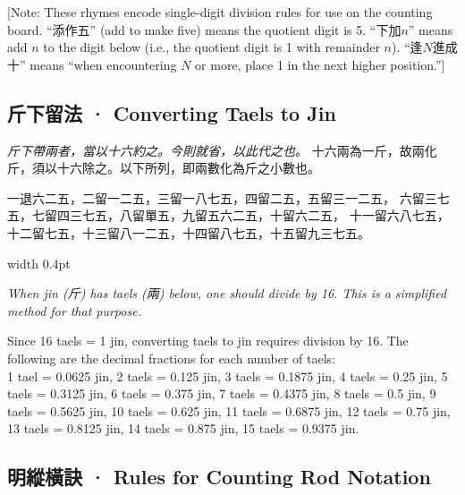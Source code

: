 \documentclass[10pt,a4paper]{article}
\newlength{\cnwidth}
\newlength{\enwidth}
\newcommand{\bilingual}[2]{%
  \noindent%
  \begin{minipage}[t]{\cnwidth}%
    #1%
  \end{minipage}%
  \hfill\vrule width 0.4pt\hfill%
  \begin{minipage}[t]{\enwidth}%
    #2%
  \end{minipage}%
  \par\smallskip%
}
\newcommand{\bilingualsubsection}[2]{%
  \subsection*{#1 · #2}
}
\newcommand{\transnote}[1]{%
  \par\smallskip\noindent\textcolor{notecolor}{\small[Note: #1]}\par\smallskip
}
\begin{document}
\transnote{These rhymes encode single-digit division rules for use on the counting board.
``添作五'' (add to make five) means the quotient digit is 5. ``下加$n$'' means add $n$
to the digit below (i.e., the quotient digit is 1 with remainder $n$). ``逢$N$進成十''
means ``when encountering $N$ or more, place 1 in the next higher position.''}

\bilingualsubsection{斤下留法}{Converting Taels to Jin}

\bilingual{%
  \textit{斤下帶兩者，當以十六約之。今則就省，以此代之也。}
  十六兩為一斤，故兩化斤，須以十六除之。以下所列，即兩數化為斤之小數也。

  一退六二五，二留一二五，三留一八七五，四留二五，五留三一二五，
  六留三七五，七留四三七五，八留單五，九留五六二五，十留六二五，
  十一留六八七五，十二留七五，十三留八一二五，十四留八七五，十五留九三七五。
}{%
  \textit{When jin (斤) has taels (兩) below, one should divide by 16. This is a simplified
  method for that purpose.}

  Since 16 taels = 1 jin, converting taels to jin requires division by 16.
  The following are the decimal fractions for each number of taels:\\
  1 tael = 0.0625 jin, 2 taels = 0.125 jin, 3 taels = 0.1875 jin,
  4 taels = 0.25 jin, 5 taels = 0.3125 jin, 6 taels = 0.375 jin,
  7 taels = 0.4375 jin, 8 taels = 0.5 jin, 9 taels = 0.5625 jin,
  10 taels = 0.625 jin, 11 taels = 0.6875 jin, 12 taels = 0.75 jin,
  13 taels = 0.8125 jin, 14 taels = 0.875 jin, 15 taels = 0.9375 jin.
}


\bilingualsubsection{明縱橫訣}{Rules for Counting Rod Notation}
\end{document}
